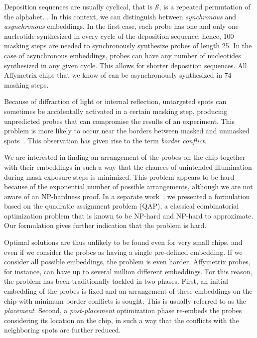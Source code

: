 \documentclass[runningheads]{llncs}
\newcommand{\ignore}[1]{}
\begin{document}
Deposition sequences are usually cyclical, that is $\mathcal{S}$, is a repeated
permutation of the alphabet. \ignore{This is mainly because such sequences maximize the
number of possible subsequences \cite{CHASE76}}. In this context, we can
distinguish between \emph{synchronous} and \emph{asynchronous} embeddings. In
the first case, each probe has one and only one nucleotide synthesized in every
cycle of the deposition sequence; hence, 100 masking steps are needed to
synchronously synthesize probes of length 25.
In the case of asynchronous
embeddings, probes can have any number of nucleotides synthesized in any given
cycle. This allows for shorter deposition sequences. All Affymetrix chips that
we know of can be asynchronously synthesized in 74 masking steps.

\ignore{We
understand that Affymetrix uses the same truncated repetition of TGCA to
synthesize most (if not all) GeneChip arrays, which suggests that their probe
selection procedure is restricted to sequences that fit into this deposition
sequence.}

Because of diffraction of light or internal reflection, untargeted spots can
sometimes be accidentally activated in a certain masking step, producing
unpredicted probes that can compromise the results of an experiment. This problem
is more likely to occur near the borders between masked and unmasked
spots~\cite{FODOR91}. This observation has
given rise to the term \emph{border conflict}.

We are interested in finding an arrangement of the probes on the chip together
with their embeddings in such a way that the chances of unintended
illumination during mask exposure steps is minimized. This problem appears to
be hard because of the exponential number of possible arrangements,
although we are not aware of an NP-hardness proof.
In a separate work~\cite{CARVALHO06}, we presented a formulation based on
the quadratic assignment problem (QAP), a classical combinatorial optimization
problem that is known to be NP-hard and NP-hard to approximate. Our formulation
gives further indication that the problem is hard.

Optimal solutions are thus
unlikely to be found even for very small chips, and even if we consider the probes
as having a single pre-defined embedding.
If we consider all possible embeddings, the problem is even
harder. Affymetrix probes, for instance, can have up to several million different
embeddings. For this reason, the problem has been traditionally tackled in two
phases. First, an initial embedding of the probes is fixed and an arrangement of
these embeddings on the chip with minimum border conflicts is sought. This is
usually referred to as the \emph{placement}. Second, a \emph{post-placement}
optimization phase re-embeds the probes considering its location on the chip,
in such a way that the conflicts with the neighboring spots are further reduced.
\end{document}
